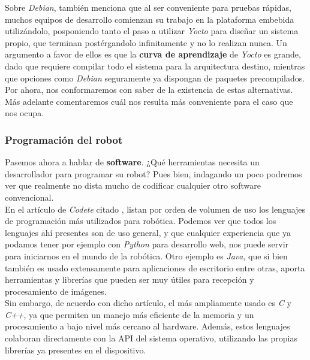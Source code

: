 Sobre \textit{Debian}, también menciona que al ser conveniente para pruebas rápidas, muchos equipos de desarrollo comienzan su trabajo en la plataforma embebida utilizándolo, posponiendo tanto el paso a utilizar \textit{Yocto} para diseñar un sistema propio, que terminan postérgandolo infinitamente y no lo realizan nunca. Un argumento a favor de ellos es que la \textbf{curva de aprendizaje} de \textit{Yocto} es grande, dado que requiere compilar todo el sistema para la arquitectura destino, mientras que opciones como \textit{Debian} seguramente ya dispongan de paquetes precompilados.\\

Por ahora, nos conformaremos con saber de la existencia de estas alternativas. Más adelante comentaremos cuál nos resulta más conveniente para el caso que nos ocupa.\\


\subsubsection{Programación del robot}

Pasemos ahora a hablar de \textbf{software}. ¿Qué herramientas necesita un desarrollador para programar su robot? Pues bien, indagando un poco podremos ver que realmente no dista mucho de codificar cualquier otro software convencional.\\

En el artículo de \textit{Codete} citado \cite{codete}, listan por orden de volumen de uso los lenguajes de programación más utilizados para robótica. Podemos ver que todos los lenguajes ahí presentes son de uso general, y que cualquier experiencia que ya podamos tener por ejemplo con \textit{Python} para desarrollo web, nos puede servir para iniciarnos en el mundo de la robótica. Otro ejemplo es \textit{Java}, que si bien también es usado extensamente para aplicaciones de escritorio entre otras, aporta herramientas y librerías que pueden ser muy útiles para recepción y procesamiento de imágenes.\\

Sin embargo, de acuerdo con dicho artículo, el más ampliamente usado es \textit{C} y \textit{C++}, ya que permiten un manejo más eficiente de la memoria y un procesamiento a bajo nivel más cercano al hardware. Además, estos lenguajes colaboran directamente con la API del sistema operativo, utilizando las propias librerías ya presentes en el dispositivo.\\

